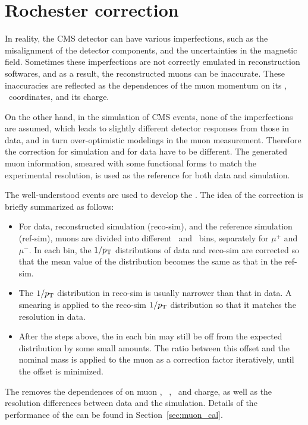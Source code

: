 \section{Rochester correction} \label{sec:Roch_corr}

In reality, the CMS detector can have various imperfections, 
such as the misalignment of the detector components, and the uncertainties in the magnetic field.
Sometimes these imperfections are not correctly emulated in reconstruction softwares, 
and as a result, the reconstructed muons can be inaccurate.
These inaccuracies are reflected as the dependences of the muon momentum on its \eta, \phi ~coordinates, and its charge.

On the other hand, in the simulation of CMS events, none of the imperfections are assumed,
which leads to slightly different detector responses from those in data, and in turn over-optimistic modelings in the muon measurement. 
Therefore the correction for simulation and for data have to be different.
The generated muon information, smeared with some functional forms to match the experimental resolution, 
is used as the reference for both data and simulation. 

The well-understood \zmm events are used to develop the \RochCorr. 
The idea of the correction is briefly summarized as follows:
\begin{itemize}
  \item For data, reconstructed simulation (reco-sim), and the reference simulation (ref-sim), 
        muons are divided into different \eta ~and \phi ~bins, separately for $\mu^{+}$ and $\mu^{-}$.
        In each bin, the $1/p_{\mathrm{T}}$ distributions of data and reco-sim are corrected so that the mean value of the distribution becomes the same as that in the ref-sim.
  \item The $1/p_{\mathrm{T}}$ distribution in reco-sim is usually narrower than that in data. 
        A smearing is applied to the reco-sim $1/p_{\mathrm{T}}$ distribution so that it matches the resolution in data.
  \item After the steps above, the \mmm in each bin may still be off from the expected distribution by some small amounts.
        The ratio between this offset and the nominal \PZ mass is applied to the muon \pt as a correction factor iteratively, until the offset is minimized.
\end{itemize}
The \RochCorr removes the dependences of \mmm on muon \eta,~ \phi,~ and charge, 
as well as the \mmm resolution differences between data and the simulation.
Details of the performance of the \RochCorr can be found in Section~\ref{sec:muon_cal}.


